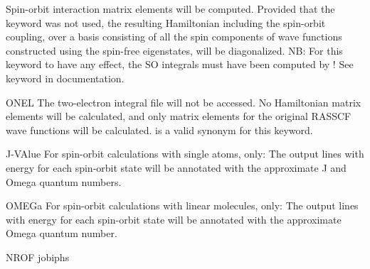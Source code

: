 \begin{keywordlist}
Spin-orbit interaction matrix elements will be computed. Provided that
the  keyword was not used, the resulting Hamiltonian including the
spin-orbit coupling, over a basis consisting of all the spin components
of wave functions constructed using the spin-free eigenstates, will be
diagonalized.  NB: For this keyword to have any effect, the SO integrals
must have been computed by ! See  keyword in  documentation.
\item[ONEL]
The two-{}electron integral file will not be accessed. No Hamiltonian
matrix elements will be calculated, and only matrix elements for the
original RASSCF wave functions will be calculated.
 is a valid synonym for this keyword.
\item[J-VAlue]
For spin-orbit calculations with single atoms, only: The output lines
with energy for each spin-orbit state will be annotated with the
approximate J and Omega quantum numbers.
\item[OMEGa]
For spin-orbit calculations with linear molecules, only: The output lines
with energy for each spin-orbit state will be annotated with the
approximate Omega quantum number.
\item[NROF jobiphs]

\end{keywordlist}
